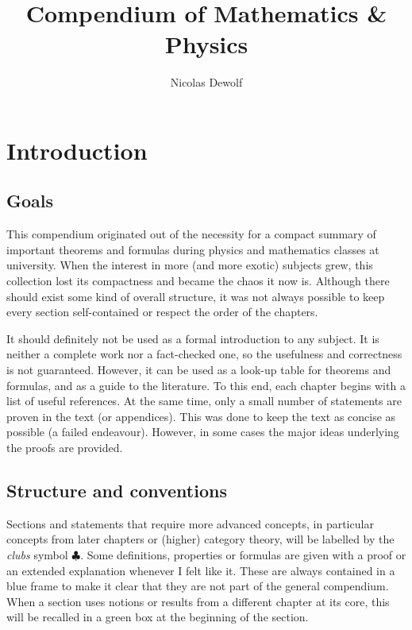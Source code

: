 \documentclass[12pt, a4paper]{report}
\begin{document}
\hypersetup{allcolors = black}

\title{Compendium of Mathematics \& Physics}
\author{Nicolas Dewolf}
\maketitle

\tableofcontents

\hypersetup{allcolors = UGent}

\chapter{Introduction}
\section{Goals}

   This compendium originated out of the necessity for a compact summary of important theorems and formulas during physics and mathematics classes at university. When the interest in more (and more exotic) subjects grew, this collection lost its compactness and became the chaos it now is. Although there should exist some kind of overall structure, it was not always possible to keep every section self-contained or respect the order of the chapters.

   It should definitely not be used as a formal introduction to any subject. It is neither a complete work nor a fact-checked one, so the usefulness and correctness is not guaranteed. However, it can be used as a look-up table for theorems and formulas, and as a guide to the literature. To this end, each chapter begins with a list of useful references. At the same time, only a small number of statements are proven in the text (or appendices). This was done to keep the text as concise as possible (a failed endeavour). However, in some cases the major ideas underlying the proofs are provided.

\section{Structure and conventions}

   Sections and statements that require more advanced concepts, in particular concepts from later chapters or (higher) category theory, will be labelled by the \textit{clubs} symbol $\clubsuit$. Some definitions, properties or formulas are given with a proof or an extended explanation whenever I felt like it. These are always contained in a blue frame to make it clear that they are not part of the general compendium. When a section uses notions or results from a different chapter at its core, this will be recalled in a green box at the beginning of the section.
\end{document}
